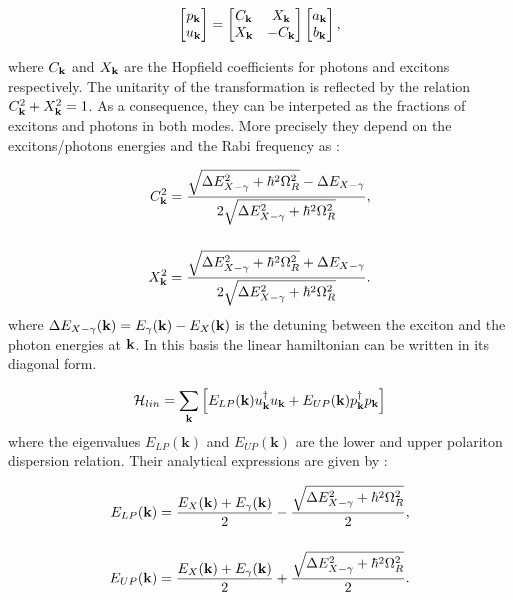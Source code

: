 \begin{equation}
    \label{eq:unitary_transformation}
    \begin{bmatrix}
    p_{\mathbf{k}} \\
    u_{\mathbf{k}}
    \end{bmatrix} 
    = 
    \begin{bmatrix}
    C_{\mathbf{k}} & X_{\mathbf{k}} \\
    X_{\mathbf{k}} & -C_{\mathbf{k}}
    \end{bmatrix}
    \begin{bmatrix}
    a_{\mathbf{k}} \\
    b_{\mathbf{k}}
    \end{bmatrix},
\end{equation}

where $C_{\mathbf{k}}$ and $X_{\mathbf{k}}$ are the Hopfield coefficients for photons and excitons respectively. The unitarity of the transformation
is reflected by the relation $C_{\mathbf{k}}^2 + X_{\mathbf{k}}^2 = 1$. As a consequence, they can be interpeted as the fractions of excitons and photons in both modes.
More precisely they depend on the excitons/photons energies and the Rabi frequency as : 

\begin{subequations}
    \begin{align}
    C_{\mathbf{k}}^2 &= \dfrac{\sqrt{\Delta E_{X-\gamma}^2 + \hbar^2\Omega_R^2}- \Delta E_{X-\gamma}}{2\sqrt{\Delta E_{X-\gamma}^2 + \hbar^2\Omega_R^2}}, \\[5mm]
    X_{\mathbf{k}}^2 &=  \dfrac{\sqrt{\Delta E_{X-\gamma}^2 + \hbar^2\Omega_R^2}+ \Delta E_{X-\gamma}}{2\sqrt{\Delta E_{X-\gamma}^2 + \hbar^2\Omega_R^2}}.
    \end{align}
    \label{eq:hopfield_coefficients}
\end{subequations}
where $\Delta E_{X-\gamma}(\mathbf{k}) = E_{\gamma}(\mathbf{k})-E_X(\mathbf{k})$ is the detuning between the exciton and the photon energies at $\mathbf{k}$. 
In this basis the linear hamiltonian can be written in its diagonal form.



\begin{equation}
    \mathcal{H}_{lin} = \sum_{\mathbf{k}}\left[E_{LP}(\mathbf{k})u_{\mathbf{k}}^{\dagger}u_{\mathbf{k}} + E_{UP}(\mathbf{k})p_{\mathbf{k}}^{\dagger}p_{\mathbf{k}}\right]
    \label{eq:linear_hamiltonian_diagonal}
\end{equation}
where the eigenvalues $E_{LP}(\mathbf{k})$ and $E_{UP}(\mathbf{k})$ are the lower and upper polariton dispersion relation. Their analytical expressions 
are given by :

\begin{equation}
    \begin{align}
    E_{LP}(\mathbf{k}) &= \dfrac{E_X(\mathbf{k})+E_{\gamma}(\mathbf{k})}{2} - \dfrac{\sqrt{\Delta E_{X-\gamma}^2 + \hbar^2\Omega_R^2}}{2}, \\[5mm]
    E_{UP}(\mathbf{k}) &= \dfrac{E_X(\mathbf{k})+E_{\gamma}(\mathbf{k})}{2} + \dfrac{\sqrt{\Delta E_{X-\gamma}^2 + \hbar^2\Omega_R^2}}{2}.
    \end{align}
    \label{eq:polariton_dispersion}
\end{equation}

